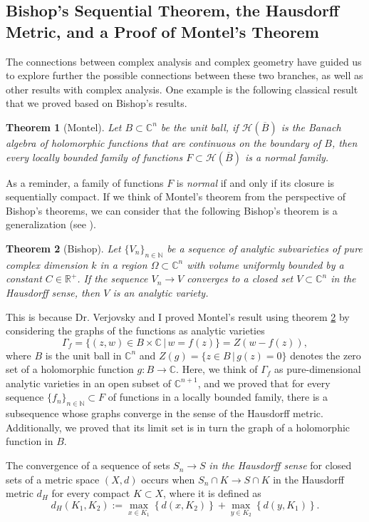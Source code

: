 \documentclass[12pt,twoside,a4paper]{report}
\newtheorem{theorem}{Theorem}[section]
\newcommand{\nat}{\ensuremath{ \mathbb N }}
\newcommand{\co}{\ensuremath{\mathbb C }}
\newcommand{\con}{\ensuremath{\mathbb{C}^n}}
\newcommand{\re}{\ensuremath{\mathbb R }}
\begin{document}
\subsection{Bishop's Sequential Theorem, the Hausdorff Metric, and a Proof of Montel's Theorem}
\noindent The connections between complex analysis and complex geometry have guided us to explore further the possible connections between these two branches,
as well as other results with complex analysis. One example is the following classical result that we proved
based on Bishop's results.
\begin{theorem}[Montel]\label{Montel}
        Let $B\subset\con$ be the unit ball, if $\mathcal{H}(\overline{B})$ is the Banach algebra of holomorphic functions that are continuous
        on the boundary of $B$, then every locally bounded family of functions $F\subset\mathcal{H}(\overline{B})$ is a \textit{normal} family.
\end{theorem}
As a reminder, a family of functions $F$ is \textit{normal} if and only if its closure is sequentially compact.
If we think of Montel's theorem from the perspective of Bishop's theorems, we can consider that the following Bishop's theorem is a
generalization (see \cite[p. 30]{Stolzenberg}).

\begin{theorem}[Bishop]\label{Bishop2}
        Let $\{ V_n \}_{n\in\nat}$ be a sequence of analytic subvarieties of pure complex dimension $k$ in a region
        $\Omega\subset\con$ with volume uniformly bounded by a constant $C\in\re^{+}$.
        If the sequence $V_n\rightarrow V$ converges to a closed set $V\subset\con$ in the Hausdorff sense, then $V$ is an
        analytic variety.
\end{theorem}
This is because Dr. Verjovsky and I proved Montel's result using theorem \ref{Bishop2} by considering the graphs of the
functions as analytic varieties
\[
        \Gamma_{f}=\{(z,w)\in B\times\co\,|\,w=f(z)\}=Z(w-f(z)),
\]
\noindent where $B$ is the unit ball in $\con$ and $Z(g)=\{z\in B\,|\,g(z)=0\}$ denotes the zero set of a holomorphic function $g:B\rightarrow\co$. Here, we think of $\Gamma_{f}$ as pure-dimensional analytic varieties in an open subset of $\co^{n+1}$, and we proved
that for every sequence $\{f_n\}_{n\in\nat}\subset F$ of functions in a locally bounded family, there is a subsequence
whose graphs converge in the sense of the Hausdorff metric. Additionally, we proved that its limit set
is in turn the graph of a holomorphic function in $B$.

The convergence of a sequence of sets $S_n\rightarrow S$ \emph{in the Hausdorff sense} for closed sets of a metric space $(X,d)$
occurs when $S_n\cap K\rightarrow S\cap K$ in the Hausdorff metric $d_H$ for every compact $K\subset X$, where it is defined as
\[
        d_H(K_1,K_2):= \max_{x\in K_1}\left\{d(x,K_2)\right\}+\max_{y\in K_2}\left\{d(y,K_1)\right\}.
\]
\end{document}
